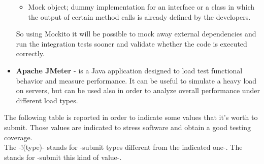\begin{itemize}
\begin{itemize}
\item Mock object; dummy implementation for an interface or a class in which the output of certain method calls is already defined by the developers. 
\end{itemize}
So using Mockito it will be possible to mock away external dependencies and run the integration tests sooner and validate whether the code is executed correctly.

\item \textbf{Apache JMeter} - is a Java application designed to load test functional behavior and measure performance. It can be useful to simulate a heavy load on servers, but can be used also in order to analyze overall performance under different load types.
\end{itemize}
The following table is reported in order to indicate some values that it's worth to submit. Those values are indicated to stress software and obtain a good testing coverage. \\
The -!(type)- stands for -submit types different from the indicated one-. The \checkmark stands for -submit this kind of value-.
